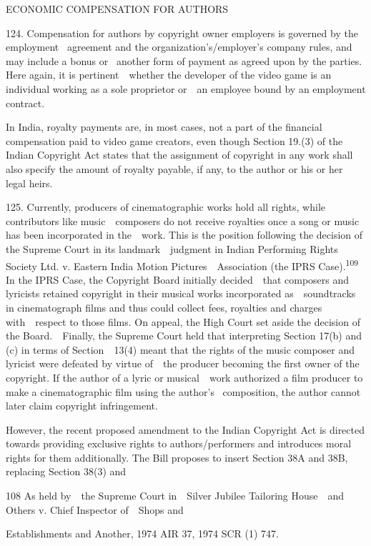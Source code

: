 \documentclass[
]{article}
\begin{document}
{ECONOMIC COMPENSATION FOR AUTHORS}

{124. }{Compensation for authors by copyright owner employers is
governed by the employment }{~agreement and the
organization's/employer's company rules, and may include a bonus or
}{~another form of payment as agreed upon by the parties. Here again, it
is pertinent~~whether the developer of the video game is an individual
working as a sole proprietor or~~an employee bound by an employment
contract.}

{In India, royalty payments are, in most cases, not a part of the
financial compensation paid to video game creators, even though Section
19.(3) of the Indian }{Copyright Act }{states that the assignment of
copyright in any work shall also specify the amount of royalty payable,
if any, to the author or his or her legal heirs.}

{125. }{Currently, producers of cinematographic works hold all rights,
while contributors like music~~composers do not receive royalties once a
song or music has been incorporated in the~~work. This is the position
following the decision of the Supreme Court in its landmark~~judgment in
}{Indian Performing Rights Society Ltd. v. Eastern India Motion
Pictures~~Association }{(the }{IPRS Case}{).}\textsuperscript{{109 }}{In
the }{IPRS Case}{, the Copyright Board initially decided~~that composers
and lyricists retained copyright in their musical works incorporated
as~~soundtracks in cinematograph films and thus could collect fees,
royalties and charges with~~respect to those films. On appeal, the High
Court set aside the decision of the Board.~~Finally, the Supreme Court
held that interpreting Section 17(b) and (c) in terms of Section~~13(4)
meant that the rights of the music composer and lyricist were defeated
by virtue of~~the producer becoming the first owner of the copyright. If
the author of a lyric or musical~~work authorized a film producer to
make a cinematographic }{film using the author's }{~composition, the
author cannot later claim copyright infringement.}

{However, the recent proposed amendment to the Indian }{Copyright Act
}{is directed towards providing exclusive rights to authors/performers
and introduces moral rights for them additionally. The Bill proposes to
insert Section 38A and 38B, replacing Section 38(3) and}

{108 }{As held by~~the Supreme Court in~~}{Silver Jubilee Tailoring
House~~and Others v. Chief Inspector of~~Shops and}

{Establishments and Another, }{1974 AIR 37, 1974 SCR (1) 747.}
\end{document}
